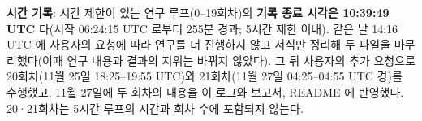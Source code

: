 \textbf{시간 기록}: 시간 제한이 있는 연구 루프(0--19회차)의 \textbf{기록 종료 시각은 10:39:49 UTC} 다(시작 06:24:15 UTC 로부터 255분 경과; 5시간 제한 이내). 같은 날 14:16 UTC 에 사용자의 요청에 따라 연구를 더 진행하지 않고 서식만 정리해 두 파일을 마무리했다(이때 연구 내용과 결과의 지위는 바뀌지 않았다). 그 뒤 사용자의 추가 요청으로 20회차(11월 25일 18:25--19:55 UTC)와 21회차(11월 27일 04:25--04:55 UTC 경)를 수행했고, 11월 27일에 두 회차의 내용을 이 로그와 보고서, README 에 반영했다. 20·21회차는 5시간 루프의 시간과 회차 수에 포함되지 않는다.
